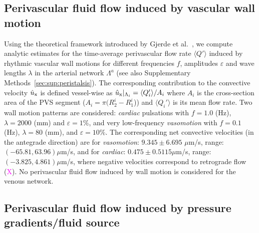 \documentclass[fleqn,10pt]{wlscirep}
\newcommand{\mer}[1]{\textcolor{magenta}{#1}}
\begin{document}
\subsection*{Perivascular fluid flow induced by vascular wall motion}

Using the theoretical framework introduced by Gjerde et
al.~\cite{gjerde2023directional}, we compute analytic estimates for
the time-average perivascular flow rate $\langle Q' \rangle$ induced
by rhythmic vascular wall motions for different frequencies $f$,
amplitudes $\varepsilon$ and wave lengths $\lambda$ in the arterial
network $\Lambda^a$ (see also Supplementary
Methods~\ref{sec:sup:peristalsis}). The corresponding contribution to
the convective velocity $\hat{u}_{\rm x}$ is defined vessel-wise as
$\hat{u}_{\rm x}|_{\Lambda_i} = \langle Q'_i \rangle/A_i$ where $A_i$
is the cross-section area of the PVS segment ($A_i = \pi (R_2^i -
R_1^i$)) and $\langle Q_i' \rangle$ is its mean flow rate. Two wall
motion patterns are considered: \emph{cardiac} pulsations with $f =
1.0$ (Hz), $\lambda = 2000$ (mm) and $\varepsilon = 1\%$, and very
low-frequency \emph{vasomotion} with $f = 0.1$ (Hz), $\lambda = 80$
(mm), and $\varepsilon = 10\%$. The corresponding net convective
velocities (in the antegrade direction) are for \emph{vasomotion}:
$9.345 \pm 6.695$ $\mu$m/s, range: $(-65.81, 63.96) \mu$m/s, and for
\emph{cardiac}: $0.475 \pm 0.5115 \mu$m/s, range: $(- 3.825, 4.861)
\mu$m/s, where negative velocities correspond to retrograde flow
(\mer{X}). No perivascular fluid flow induced by wall
motion is considered for the venous network.


\subsection*{Perivascular fluid flow induced by pressure gradients/fluid source}
\end{document}
